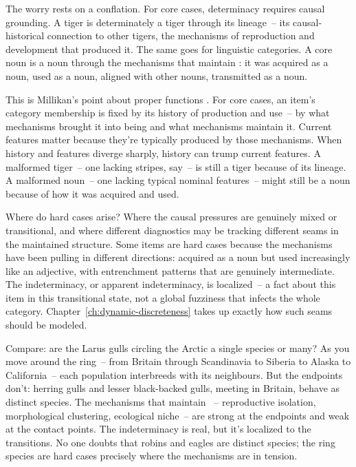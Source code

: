The worry rests on a conflation. For core cases, determinacy requires causal grounding. A tiger is determinately a tiger through its lineage~-- its causal-historical connection to other tigers, the mechanisms of reproduction and development that produced it. The same goes for linguistic categories. A core noun is a noun through the mechanisms that maintain : it was acquired as a noun, used as a noun, aligned with other nouns, transmitted as a noun.

This is Millikan's point about proper functions \citep[ch.~1]{millikan1984}. For core cases, an item's category membership is fixed by its history of production and use~-- by what mechanisms brought it into being and what mechanisms maintain it. Current features matter because they're typically produced by those mechanisms. When history and features diverge sharply, history can trump current features. A malformed tiger~-- one lacking stripes, say~-- is still a tiger because of its lineage. A malformed noun~-- one lacking typical nominal features~-- might still be a noun because of how it was acquired and used.

Where do hard cases arise? Where the causal pressures are genuinely mixed or transitional, and where different diagnostics may be tracking different seams in the maintained structure. Some items are hard cases because the mechanisms have been pulling in different directions: acquired as a noun but used increasingly like an adjective, with entrenchment patterns that are genuinely intermediate. The indeterminacy, or apparent indeterminacy, is localized~-- a fact about this item in this transitional state, not a global fuzziness that infects the whole category. Chapter~\ref{ch:dynamic-discreteness} takes up exactly how such seams should be modeled.

Compare: are the Larus gulls circling the Arctic a single species or many? As you move around the ring~-- from Britain through Scandinavia to Siberia to Alaska to California~-- each population interbreeds with its neighbours. But the endpoints don't: herring gulls and lesser black-backed gulls, meeting in Britain, behave as distinct species. The mechanisms that maintain ~-- reproductive isolation, morphological clustering, ecological niche~-- are strong at the endpoints and weak at the contact points. The indeterminacy is real, but it's localized to the transitions. No one doubts that robins and eagles are distinct species; the ring species are hard cases precisely where the mechanisms are in tension.

